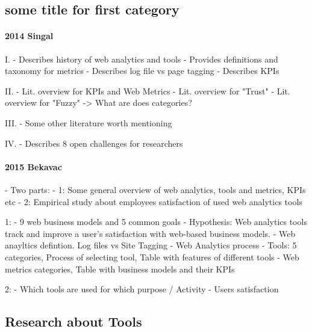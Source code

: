 \subsection{some title for first category}

\paragraph{2014 Singal}

I.
- Describes history of web analytics and tools
- Provides definitions and taxonomy for metrics
- Describes log file vs page tagging
- Describes KPIs

II.
- Lit. overview for KPIs and Web Metrics
- Lit. overview for "Trust"
- Lit. overview for "Fuzzy"
-> What are does categories?


III.
- Some other literature worth mentioning


IV.
- Describes 8 open challenges for researchers




\paragraph{2015 Bekavac}

- Two parts:
	- 1: Some general overview of web analytics, tools and metrics, KPIs etc
	- 2: Empirical study about employees satisfaction of used web analytics tools

1: 
- 9 web business models and 5 common goals
- Hypothesis: Web analytics tools track and improve a user’s satisfaction with web-based business models.
- Web anayltics defintion. Log files vs Site Tagging
- Web Analytics process
- Tools: 5 categories, Process of selecting tool, Table with features of different tools
- Web metrics categories, Table with business models and their KPIs

2:
- Which tools are used for which purpose / Activity
- Users satisfaction





\subsection{Research about Tools}



